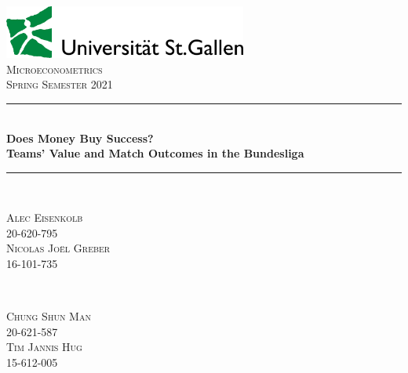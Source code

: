 \documentclass[11pt]{article}
\begin{document}

\begin{titlepage}

	\newcommand{\HRule}{\rule{\linewidth}{0.5mm}}

	\center


	\includegraphics[width=0.6\textwidth]{unisg.png}\\[2cm]


	\textsc{\Large Microeconometrics}\\[0.5cm]

	\textsc{\large Spring Semester 2021}\\[0.5cm]


	\HRule\\[0.4cm]

	{\huge\bfseries Does Money Buy Success? \\
	Teams' Value and Match Outcomes in the Bundesliga}\\[0.4cm]

	\HRule\\[1.5cm]


	\begin{minipage}{0.4\textwidth}
		\begin{flushleft}
			\large
			\textsc{Alec Eisenkolb}\\
			20-620-795\\ \vspace{12pt}
			\textsc{Nicolas Joël Greber}\\
			16-101-735
		\end{flushleft}
	\end{minipage}
	~
	\begin{minipage}{0.4\textwidth}
		\begin{flushright}
			\large
			\textsc{Chung Shun Man}\\
			20-621-587\\ \vspace{12pt}
			\textsc{Tim Jannis Hug}\\
			15-612-005
		\end{flushright}
	\end{minipage}


\end{titlepage}
\end{document}
